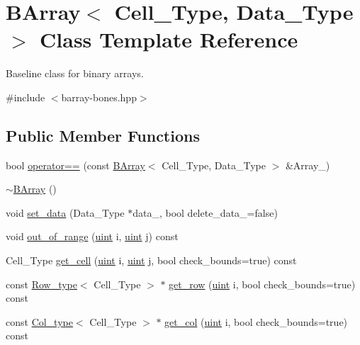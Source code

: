 \hypertarget{class_b_array}{}\section{B\+Array$<$ Cell\+\_\+\+Type, Data\+\_\+\+Type $>$ Class Template Reference}
\label{class_b_array}


Baseline class for binary arrays.  




{\ttfamily \#include $<$barray-\/bones.\+hpp$>$}

\subsection*{Public Member Functions}
\begin{DoxyCompactItemize}
\item 
bool \hyperlink{class_b_array_a1e6e18162202b06e19f214097eb993bf}{operator==} (const \hyperlink{class_b_array}{B\+Array}$<$ Cell\+\_\+\+Type, Data\+\_\+\+Type $>$ \&Array\+\_\+)
\item 
\hyperlink{class_b_array_af39acdf29aa5999a7f5fd48141be384e}{$\sim$\+B\+Array} ()
\item 
void \hyperlink{class_b_array_accf44b49caa7746a462a3ac9b6024cfc}{set\+\_\+data} (Data\+\_\+\+Type $\ast$data\+\_\+, bool delete\+\_\+data\+\_\+=false)
\item 
void \hyperlink{class_b_array_a87bad4dcad82009d5721d21808b7e469}{out\+\_\+of\+\_\+range} (\hyperlink{typedefs_8hpp_a91ad9478d81a7aaf2593e8d9c3d06a14}{uint} i, \hyperlink{typedefs_8hpp_a91ad9478d81a7aaf2593e8d9c3d06a14}{uint} j) const
\item 
Cell\+\_\+\+Type \hyperlink{class_b_array_a4096e4447f91ba52766587a08c62f1fa}{get\+\_\+cell} (\hyperlink{typedefs_8hpp_a91ad9478d81a7aaf2593e8d9c3d06a14}{uint} i, \hyperlink{typedefs_8hpp_a91ad9478d81a7aaf2593e8d9c3d06a14}{uint} j, bool check\+\_\+bounds=true) const
\item 
const \hyperlink{typedefs_8hpp_a4deca4f3fb25a4da374818ab459b8b4a}{Row\+\_\+type}$<$ Cell\+\_\+\+Type $>$ $\ast$ \hyperlink{class_b_array_a2c969ceb1d37eff9ebcac25741de1808}{get\+\_\+row} (\hyperlink{typedefs_8hpp_a91ad9478d81a7aaf2593e8d9c3d06a14}{uint} i, bool check\+\_\+bounds=true) const
\item 
const \hyperlink{typedefs_8hpp_a3bb95a7612ee928fba42f33a96adb3eb}{Col\+\_\+type}$<$ Cell\+\_\+\+Type $>$ $\ast$ \hyperlink{class_b_array_a90bd31bc0b3fa59d11150cd4ea39b3b6}{get\+\_\+col} (\hyperlink{typedefs_8hpp_a91ad9478d81a7aaf2593e8d9c3d06a14}{uint} i, bool check\+\_\+bounds=true) const

\end{DoxyCompactItemize}
